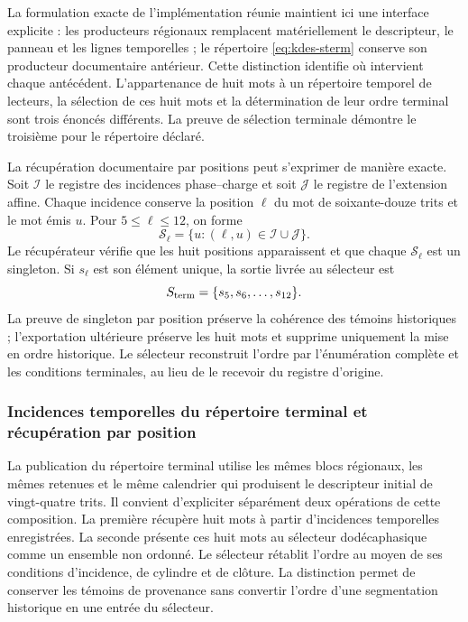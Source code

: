 La formulation exacte de l'implémentation réunie maintient ici une
interface explicite : les producteurs régionaux remplacent matériellement
le descripteur, le panneau et les lignes temporelles ; le répertoire
\eqref{eq:kdes-sterm} conserve son producteur documentaire antérieur. Cette
distinction identifie où intervient chaque antécédent. L'appartenance de
huit mots à un répertoire temporel de lecteurs, la sélection de ces
huit mots et la détermination de leur ordre terminal sont trois
énoncés différents. La preuve de sélection terminale démontre le
troisième pour le répertoire déclaré.

La récupération documentaire par positions peut s'exprimer de manière
exacte. Soit $\mathcal I$ le registre des incidences phase--charge et soit
$\mathcal J$ le registre de l'extension affine. Chaque incidence conserve
la position $\ell$ du mot de soixante-douze trits et le mot
émis $u$. Pour $5\leq\ell\leq12$, on forme
\[
 \mathcal S_\ell=
 \{u:(\ell,u)\in\mathcal I\cup\mathcal J\}.
\]
Le récupérateur vérifie que les huit positions apparaissent et que chaque
$\mathcal S_\ell$ est un singleton. Si $s_\ell$ est son élément unique,
la sortie livrée au sélecteur est
\[
 \mathcal S_{\rm term}=\{s_5,s_6,\ldots,s_{12}\}.
\]
La preuve de singleton par position préserve la cohérence des témoins historiques ; l'exportation ultérieure préserve les huit mots et supprime uniquement la mise en ordre historique. Le sélecteur reconstruit l'ordre par l'énumération complète et les conditions terminales, au lieu de le recevoir du registre d'origine.

\subsubsection{Incidences temporelles du répertoire terminal et récupération par position}
\label{sec:repertorio-incidencias-completas}

La publication du répertoire terminal utilise les mêmes blocs régionaux, les mêmes retenues et le même calendrier qui produisent le descripteur initial de vingt-quatre trits. Il convient d'expliciter séparément deux opérations de cette composition. La première récupère huit mots à partir d'incidences temporelles enregistrées. La seconde présente ces huit mots au sélecteur dodécaphasique comme un ensemble non ordonné. Le sélecteur rétablit l'ordre au moyen de ses conditions d'incidence, de cylindre et de clôture. La distinction permet de conserver les témoins de provenance sans convertir l'ordre d'une segmentation historique en une entrée du sélecteur.

